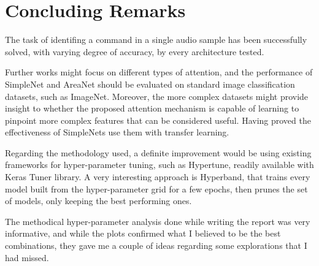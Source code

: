 
\section{Concluding Remarks}
\label{sec:conclusions}


The task of identifing a command in a single audio sample has been successfully
solved, with varying degree of accuracy, by every architecture tested.

Further works might focus on different types of attention, and the performance
of SimpleNet and AreaNet should be evaluated on standard image classification
datasets, such as ImageNet.
%
Moreover, the more complex datasets might provide insight to whether the
proposed attention mechanism is capable of learning to pinpoint more complex
features that can be considered useful.
%
Having proved the 
effectiveness of SimpleNets
use them with transfer learning.



Regarding the methodology used, a definite improvement would be using existing
frameworks for hyper-parameter tuning, such as Hypertune, readily available
with Keras Tuner library. A very interesting approach is Hyperband, that trains
every model built from the hyper-parameter grid for a few epochs, then prunes
the set of models, only keeping the best performing ones.


The methodical hyper-parameter analysis done while writing the report was very
informative, and while the plots confirmed what I believed to be the best
combinations, they gave me a couple of ideas regarding some explorations that I
had missed.
